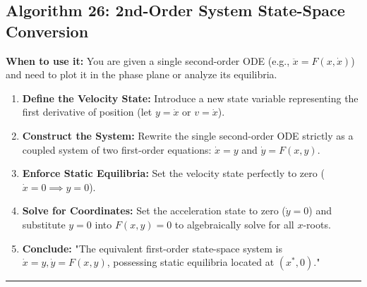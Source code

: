 \documentclass[11pt, a4paper]{report}
\begin{document}
\subsection*{Algorithm 26: 2nd-Order System State-Space Conversion}
\textbf{When to use it:} You are given a single second-order ODE (e.g., $\ddot{x} = F(x, \dot{x})$) and need to plot it in the phase plane or analyze its equilibria.
\begin{enumerate}[label=\textbf{\arabic*.}]
    \item \textbf{Define the Velocity State:} Introduce a new state variable representing the first derivative of position (let $y = \dot{x}$ or $v = \dot{x}$).
    \item \textbf{Construct the System:} Rewrite the single second-order ODE strictly as a coupled system of two first-order equations: $\dot{x} = y$ and $\dot{y} = F(x, y)$.
    \item \textbf{Enforce Static Equilibria:} Set the velocity state perfectly to zero ($\dot{x} = 0 \implies y = 0$).
    \item \textbf{Solve for Coordinates:} Set the acceleration state to zero ($\dot{y} = 0$) and substitute $y=0$ into $F(x,y) = 0$ to algebraically solve for all $x$-roots.
    \item \textbf{Conclude:} "The equivalent first-order state-space system is $\dot{x}=y, \dot{y}=F(x,y)$, possessing static equilibria located at $(x^*, 0)$."
\end{enumerate}
\vspace{1em}
\noindent\rule{\textwidth}{0.4pt}
\vspace{1em}
\end{document}
